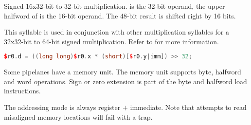 \noindent Signed 16x32-bit to 32-bit multiplication.  is the 32-bit operand,
the upper halfword of \code{[$r0.y|imm]} is the 16-bit operand. The 48-bit result is
shifted right by 16 bits.

This syllable is used in conjunction with other multiplication syllables for a
32x32-bit to 64-bit signed multiplication. Refer to  for more
information.

\begin{lstlisting}[numbers=none, basicstyle=\ttfamily\footnotesize, language=C++]
$r0.d = ((long long)$r0.x * (short)[$r0.y|imm]) >> 32;
\end{lstlisting}

Some \rvex{} pipelanes have a memory unit. The memory unit supports byte,
halfword and word operations. Sign or zero extension is part of the byte and
halfword load instructions.

The addressing mode is always register $+$ immediate. Note that attempts to read
misaligned memory locations will fail with a  trap.

